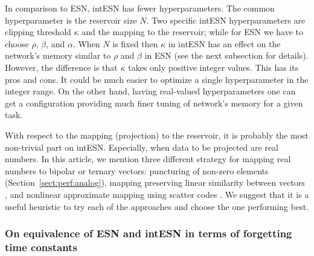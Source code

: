 In comparison to ESN, intESN has fewer hyperparameters. The common hyperparameter is the reservoir size $N$. Two specific intESN hyperparameters are clipping threshold $\kappa$ and the mapping to the reservoir; while for ESN we have to choose $\rho$, $\beta$, and $\alpha$.
When $N$ is fixed then $\kappa$ in intESN has an effect on the network's memory similar to $\rho$ and $\beta$ in ESN (see the next subsection for details). 
However, the difference is that $\kappa$ takes only positive integer values. 
This has its pros and cons. It could be much easier to optimize a single hyperparameter in the integer range.
On the other hand, having real-valued hyperparameters one can get a configuration providing much finer tuning of network's memory for a given task.  

With respect to the mapping (projection) to the reservoir, it is probably the most non-trivial part on intESN. Especially, when data to be projected are real numbers. In this article, we mention three different strategy for mapping real numbers to bipolar or ternary vectors: puncturing of non-zero elements (Section~\ref{sect:perf:analog}), mapping preserving linear similarity between vectors \cite{Widdows15}, and nonlinear approximate mapping using scatter codes \cite{TNNLS18, scatter}. We suggest that it is a useful heuristic to try each of the approaches and choose the one performing best.

\subsubsection{On equivalence of ESN and intESN in terms of forgetting time constants}


